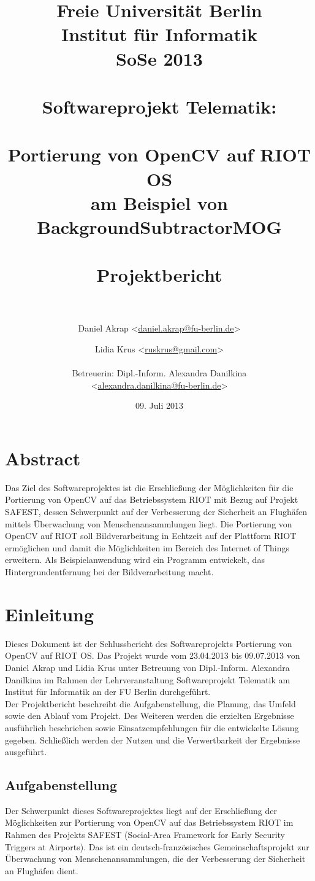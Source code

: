 \documentclass[10pt,a4paper]{article}
\title{Freie Universität Berlin \\
	Institut für Informatik \\
	SoSe 2013 \\ \ \\
	Softwareprojekt Telematik: \\ \ \\
	\textbf {Portierung von OpenCV auf RIOT OS} \\
	\textbf {am Beispiel von BackgroundSubtractorMOG} \\ \ \\
	Projektbericht \\ \ \\}
\author{Daniel Akrap  \textless\href{mailto:daniel.akrap@fu-berlin.de}{daniel.akrap@fu-berlin.de}\textgreater
        \and Lidia Krus \textless\href{mailto:ruskrus@gmail.com}{ruskrus@gmail.com}\textgreater 		\\ \\
	Betreuerin: Dipl.-Inform. Alexandra Danilkina \\ 
	\textless\href{mailto:alexandra.danilkina@fu-berlin.de}{alexandra.danilkina@fu-berlin.de}\textgreater}
\date{09. Juli 2013}
\begin{document}
\maketitle

\newpage
\section*{Abstract}

Das Ziel des Softwareprojektes ist die Erschließung der Möglichkeiten für die Portierung von OpenCV auf das Betriebssystem RIOT mit Bezug auf Projekt SAFEST, dessen Schwerpunkt auf der Verbesserung der Sicherheit an Flughäfen mittels Überwachung von Menschenansammlungen liegt. Die Portierung von OpenCV auf RIOT soll Bildverarbeitung in Echtzeit auf der Plattform RIOT ermöglichen und damit die Möglichkeiten im Bereich des Internet of Things erweitern. Als Beispielanwendung wird ein Programm entwickelt, das Hintergrundentfernung bei der Bildverarbeitung macht.

\newpage
\tableofcontents
\setcounter{tocdepth}{3}

\newpage
\section{Einleitung}

Dieses Dokument ist der Schlussbericht des Softwareprojekts \glqq Portierung von OpenCV auf RIOT OS\grqq. Das Projekt wurde vom 23.04.2013 bis 09.07.2013 von Daniel Akrap und Lidia Krus unter Betreuung von Dipl.-Inform. Alexandra Danilkina im Rahmen der Lehrveranstaltung Softwareprojekt Telematik am Institut für Informatik an der FU Berlin durchgeführt. \\

Der Projektbericht beschreibt die Aufgabenstellung, die Planung, das Umfeld sowie den Ablauf vom Projekt. Des Weiteren werden die erzielten Ergebnisse ausführlich beschrieben sowie Einsatzempfehlungen für die entwickelte Lösung gegeben. Schließlich werden der Nutzen und die Verwertbarkeit der Ergebnisse ausgeführt.

\subsection{Aufgabenstellung}

Der Schwerpunkt dieses Softwareprojektes liegt auf der Erschließung der Möglichkeiten zur Portierung von OpenCV auf das Betriebssystem RIOT im Rahmen des Projekts SAFEST (Social-Area Framework for Early Security Triggers at Airports). Das ist ein deutsch-französisches Gemeinschaftsprojekt zur Überwachung von Menschenansammlungen, die der Verbesserung der Sicherheit an Flughäfen dient. \\
\end{document}
